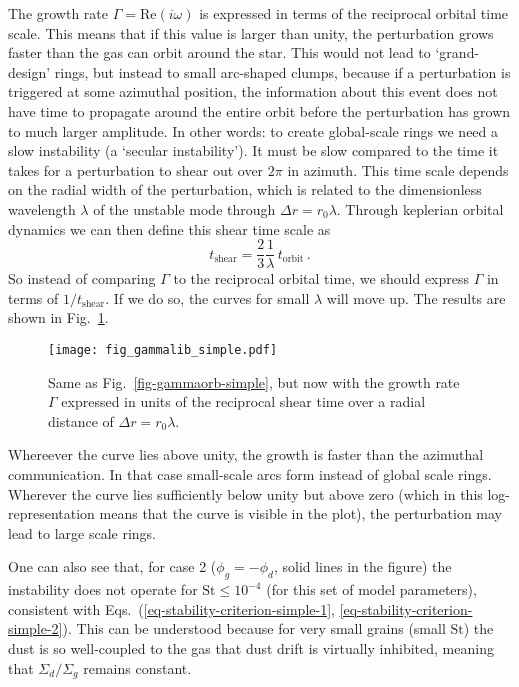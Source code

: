 \documentclass{aa}
\def\fullstop{\,.}
\newcommand{\revised}[1]{{#1}}
\begin{document}
The growth rate $\Gamma=\mathrm{Re}(i\omega)$ is expressed in terms of the
reciprocal orbital time scale. This means that if this value is larger than
unity, the perturbation grows faster than the gas can orbit around the star.
This would not lead to `grand-design' rings, but instead to small arc-shaped
clumps, because if a perturbation is triggered at some azimuthal position, the
information about this event does not have time to propagate around the entire
orbit before the perturbation has grown to much larger amplitude. In other
words: to create global-scale rings we need a slow instability (a
`secular instability'). It must be slow compared to the time it takes for a
perturbation to shear out over $2\pi$ in azimuth. This time scale depends on the
radial width of the perturbation, which is related to the dimensionless
wavelength $\lambda$ of the unstable mode through $\Delta r=r_0\lambda$. Through
keplerian orbital dynamics we can then define this shear time scale
as
\begin{equation}\label{eq-time-shear}
t_{\mathrm{shear}} = \frac{2}{3}\frac{1}{\lambda}\,t_{\mathrm{orbit}}\fullstop
\end{equation}
So instead of comparing $\Gamma$ to the reciprocal orbital time, we should
express $\Gamma$ in terms of $1/t_{\mathrm{shear}}$. If we do so, the curves for
small $\lambda$ will move up. The results are shown in
Fig.~\ref{fig-gammalib-simple}. 
%
\begin{figure}
  \centerline{\texttt{[image: fig\_gammalib\_simple.pdf]}}
  \caption{\label{fig-gammalib-simple}Same as Fig.~\ref{fig-gammaorb-simple},
    but now with the growth rate $\Gamma$ expressed in units of the reciprocal
  shear time over a radial distance of $\Delta r=r_0\lambda$.}
\end{figure}
%
Whereever the curve lies above unity, the growth is faster than the azimuthal
communication. In that case small-scale arcs form instead of global scale
rings. Wherever the curve lies sufficiently below unity but above zero (which in
this log-representation means that the curve is visible in the plot), the
perturbation may lead to large scale rings. 

One can also see that, for case 2 ($\phi_g=-\phi_d$, solid lines in the figure)
the instability does not operate for $\mathrm{St}\le 10^{-4}$ (for this
set of model parameters), \revised{consistent with Eqs.~(\ref{eq-stability-criterion-simple-1},
  \ref{eq-stability-criterion-simple-2})}. This can be
understood because for very small grains (small $\mathrm{St}$) the dust is so
well-coupled to the gas that dust drift is virtually inhibited, meaning that
$\Sigma_d/\Sigma_g$ remains constant.
\end{document}
